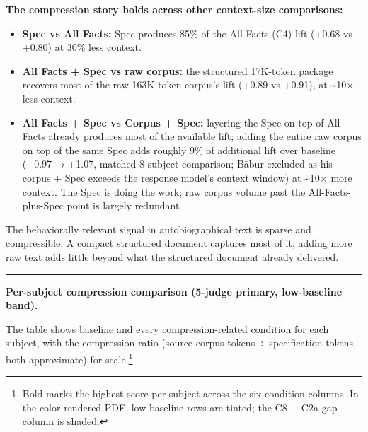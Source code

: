 \textbf{The compression story holds across other context-size
comparisons:}

\begin{itemize}
\tightlist
\item
  \textbf{Spec vs All Facts:} Spec produces 85\% of the All Facts (C4)
  lift (+0.68 vs +0.80) at 30\% less context.
\item
  \textbf{All Facts + Spec vs raw corpus:} the structured 17K-token
  package recovers most of the raw 163K-token corpus's lift (+0.89 vs
  +0.91), at \textasciitilde10× less context.
\item
  \textbf{All Facts + Spec vs Corpus + Spec:} layering the Spec on top
  of All Facts already produces most of the available lift; adding the
  entire raw corpus on top of the same Spec adds roughly 9\% of
  additional lift over baseline (+0.97 → +1.07, matched 8-subject
  comparison; Bābur excluded as his corpus + Spec exceeds the response
  model's context window) at \textasciitilde10× more context. The Spec
  is doing the work; raw corpus volume past the All-Facts-plus-Spec
  point is largely redundant.
\end{itemize}

The behaviorally relevant signal in autobiographical text is sparse and
compressible. A compact structured document captures most of it; adding
more raw text adds little beyond what the structured document already
delivered.

\begin{center}\rule{0.5\linewidth}{0.5pt}\end{center}

\textbf{Per-subject compression comparison (5-judge primary,
low-baseline band).}

The table shows baseline and every compression-related condition for
each subject, with the compression ratio (source corpus tokens ÷
specification tokens, both approximate) for scale.\footnote{Bold marks
  the highest score per subject across the six condition columns. In
  the color-rendered PDF, low-baseline rows are tinted; the C8 − C2a
  gap column is shaded.}


